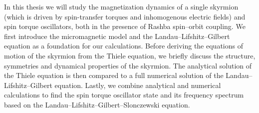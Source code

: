 In this thesis we will study the magnetization dynamics of a single skyrmion (which is driven by spin-transfer torques and inhomogenous electric fields) and spin torque oscillators, both in the presence of Rashba spin--orbit coupling. We first introduce the micromagnetic model and the Landau--Lifshitz--Gilbert equation as a foundation for our calculations. Before deriving the equations of motion of the skyrmion from the Thiele equation, we briefly discuss the structure, symmetries and dynamical properties of the skyrmion. The analytical solution of the Thiele equation is then compared to a full numerical solution of the Landau--Lifshitz--Gilbert equation. Lastly, we combine analytical and numerical calculations to find the spin torque oscillator state and its frequency spectrum based on the Landau--Lifshitz--Gilbert--Slonczewski equation. 